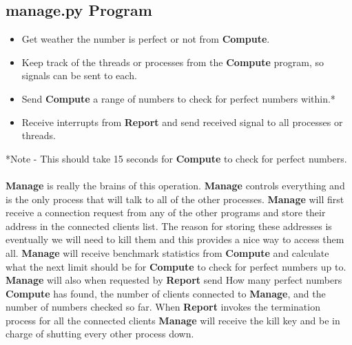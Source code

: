 \documentclass[letterpaper,10pt,notitlepage,fleqn]{article}
\begin{document}
\subsection*{manage.py Program}
\begin{itemize} 
\item Get weather the number is perfect or not from \textbf{Compute}.
\item Keep track of the threads or processes from the \textbf{Compute} program, so signals can be sent to each. 
\item Send \textbf{Compute} a range of numbers to check for perfect numbers within.*
\item Receive interrupts from \textbf{Report} and send received signal to all processes or threads.
\end{itemize}
*Note - This should take 15 seconds for \textbf{Compute} to check for perfect numbers. \\ \\
\textbf{Manage} is really the brains of this operation. \textbf{Manage} controls everything and is the only process that will talk to all of the other processes. \textbf{Manage} will first receive a connection request from any of the other programs and store their address in the connected clients list. The reason for storing these addresses is eventually we will need to kill them and this provides a nice way to access them all. \textbf{Manage} will receive benchmark statistics from \textbf{Compute} and calculate what the next limit should be for \textbf{Compute} to check for perfect numbers up to. \textbf{Manage} will also when requested by \textbf{Report} send How many perfect numbers \textbf{Compute} has found, the number of clients connected to \textbf{Manage}, and the number of numbers checked so far. When \textbf{Report} invokes the termination process for all the connected clients \textbf{Manage} will receive the kill key and be in charge of shutting every other process down. \\ \\
\scalebox{.96} %
\end{document}
